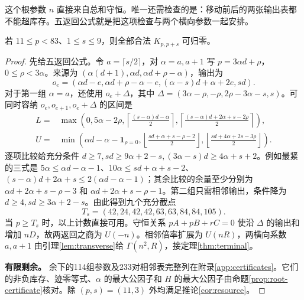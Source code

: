 这个根参数 $n$ 直接来自总和守恒。唯一还需检查的是：移动前后的两张输出表都不能超库存。五返回公式就是把这项检查与两个横向参数一起安排。
\begin{lemma}[九个低偏移的有限补充]\label{lem:small-supply}
若 $11\le p<83$、$1\le s\le9$，则全部合法 $K_{p,p+s}$ 可归零。
\end{lemma}
\begin{proof}
先给五返回公式。令 $a=\lceil s/2\rceil$，对 $\alpha=a,a+1$ 写 $p=3\alpha d+\rho$，$0\le\rho<3\alpha$。来源为 $(\alpha(d+1),\alpha d,\alpha d+\rho-\alpha)$，输出为
\[
o_e=(\alpha d-e,\alpha d+\rho-\alpha-e,(\alpha-s)d+\alpha+2e,sd).
\]
对于第一组 $\alpha=a$，还使用 $o_e+\Delta$，其中 $\Delta=(3\alpha-\rho,-\rho,2\rho-3\alpha-s,s)$。可同时容纳 $o_e,o_{e+1},o_e+\Delta$ 的区间是
\begin{align*}
L={}&\max\left(0,5\alpha-2\rho,
\left\lceil\frac{(s-\alpha)d-\alpha}{2}\right\rceil,
\left\lceil\frac{(s-\alpha)d+2\alpha+s-2\rho}{2}\right\rceil\right),\\
U={}&\min\left(\alpha d-\alpha-\mathbf1_{\rho=0},
\left\lfloor\frac{sd+\alpha+s-\rho-2}{2}\right\rfloor,
\left\lfloor\frac{sd+4\alpha+2s-3\rho}{2}\right\rfloor\right).
\end{align*}
逐项比较给充分条件 $d\ge7,sd\ge9\alpha+2-s,(3\alpha-s)d\ge4\alpha+s+2$。例如最紧的三式是 $5\alpha\le\alpha d-\alpha-1$、$10\alpha\le sd+\alpha+s-2$、$(s-\alpha)d+2\alpha+s\le2(\alpha d-\alpha-1)$；其余比较的余量至少分别为 $\alpha d+2\alpha+s-\rho-3$ 和 $\alpha d+2\alpha+s-\rho-1$。第二组只需相邻输出，条件降为 $d\ge4,sd\ge3\alpha+2-s$。由此得到九个充分截点
\[
T_s=(42,24,42,42,63,63,84,84,105).
\]
当 $p\ge T_s$ 时，以上计数直接可用。守恒关系 $pA+pB+rC=0$ 使沿 $\Delta$ 的输出和增加 $nD$，故两返回之商为 $U(-n)$。相邻倍率扩展为 $U(nR)$，两横向系数 $a,a+1$ 由引理\ref{lem:transverse}给 $\Gamma(n^2,R)$，接定理\ref{thm:terminal}。


\par\noindent\textbf{有限剩余。}
余下的114组参数及233对相邻表完整列在附录\ref{app:certificates}。它们的非负库存、迹零等式、$\alpha$ 的最大公因子和 $H$ 的最大公因子由命题\ref{prop:root-certificate}核对。除 $(p,s)=(11,3)$ 外均满足推论\ref{cor:resource}。


\end{proof}
